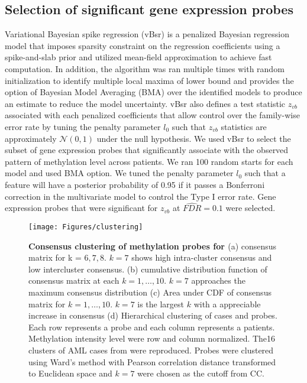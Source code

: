 \documentclass{article}
\begin{document}
\subsection{Selection of significant gene expression probes}
Variational Bayesian spike regression (vBsr) \cite{logsdon2012novel} is a penalized Bayesian regression model that imposes sparsity constraint on the regression coefficients using a spike-and-slab prior and utilized mean-field approximation to achieve fast computation. In addition, the algorithm was ran multiple times with random initialization to identify multiple local maxima of lower bound and provides the option of Bayesian Model Averaging (BMA) over the identified models to produce an estimate to reduce the model uncertainty. vBsr also defines a test statistic $z_{vb}$ associated with each penalized coefficients that allow control over the family-wise error rate by tuning the penalty parameter $l_0$ such that $z_{vb}$ statistics are approximately $\mathcal{N}(0, 1)$ under the null hypothesis. We used vBsr to select the subset of gene expression probes that significantly associate with the observed pattern of methylation level across patients. We ran 100 random starts for each model and used BMA option. We tuned the penalty parameter $l_0$ such that a feature will have a posterior probability of 0.95 if it passes a Bonferroni correction in the multivariate model to control the Type I error rate. Gene expression probes that were significant for $z_{vb}$ at $\widehat{FDR} = 0.1$ were selected. 

\begin{figure*}[htb!]
\centering
\texttt{[image: Figures/clustering]}
\caption{\textbf{Consensus clustering of methylation probes for \citet{figueroa2010dna}} (a) consensus matrix for k = $6, 7, 8$. $k = 7$ shows high intra-cluster consensus and low intercluster consensus. (b) cumulative distribution function of consensus matrix at each $k = 1, \dots, 10$. $k = 7$ approaches the maximum consensus distribution (c) Area under CDF of consensus matrix for $k = 1, \dots, 10$. $k = 7$ is the largest $k$ with a appreciable increase in consensus (d) Hierarchical clustering of cases and probes. Each row represents a probe and each column represents a patients. Methylation intensity level were row and column normalized. The16 clusters of AML cases from \citet{figueroa2010dna} were reproduced. Probes were clustered using Ward's method with Pearson correlation distance transformed to Euclidean space and $k=7$ were chosen as the cutoff from CC. }
\label{CC}
\end{figure*}
\end{document}
